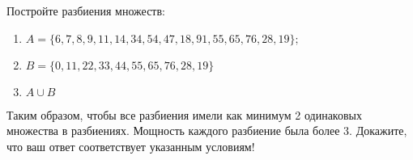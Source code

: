 \question
Постройте разбиения множеств:
\begin{enumerate}
	\renewcommand{\labelenumi}{\alph{enumi})}
	\item $A = \{6, 7, 8, 9, 11, 14, 34, 54, 47, 18, 91, 55, 65, 76, 28, 19\};$
	\item $B = \{0, 11, 22, 33, 44, 55, 65, 76, 28, 19\}$
	\item $A \cup B$
\end{enumerate}
Таким образом, чтобы все разбиения имели как минимум 2 одинаковых множества в разбиениях.
Мощность каждого разбиение была более 3.
Докажите, что ваш ответ соответствует указанным условиям!
